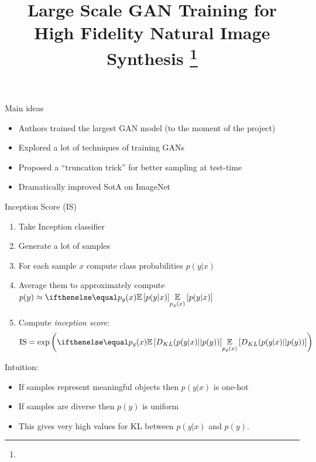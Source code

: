 \documentclass[10pt]{beamer}
\title{Large Scale GAN Training for High Fidelity Natural Image Synthesis \footnote{\citepaper{BigGAN}}}
\begin{document}
\begin{frame}
    \titlepage
\end{frame}

\begin{frame}{Main ideas}
    \pause
    \begin{itemize}
        \item\pause Authors trained the largest GAN model (to the moment of the project)
        \item\pause Explored a lot of techniques of training GANs
        \item\pause Proposed a ``truncation trick'' for better sampling at test-time
        \item\pause Dramatically improved SotA on ImageNet
    \end{itemize}
\end{frame}

\begin{frame}{Inception Score (IS)}
    \begin{enumerate}
        \item\pause Take Inception classifier
        \item\pause Generate a lot of samples
        \item\pause For each sample $x$ compute class probabilities $p(y|x)$
        \item\pause Average them to approximately compute $p(y) \approx \expect[p_g(x)]{p(y|x)}$
        \item\pause Compute \textit{inception score}:
\begin{equation}
\mathrm{IS}=\exp \left(\expect[p_{g}(x)]{D_{K L}(p(y | x)|| p(y))}\right)
\end{equation}
    \end{enumerate}

\pause
Intuition:
\begin{itemize}
    \item\pause If samples represent meaningful objects then $p(y|x)$ is one-hot
    \item\pause If samples are diverse then $p(y)$ is uniform
    \item\pause This gives very high values for KL between $p(y|x)$ and $p(y)$.
\end{itemize}

\end{frame}
\end{document}

